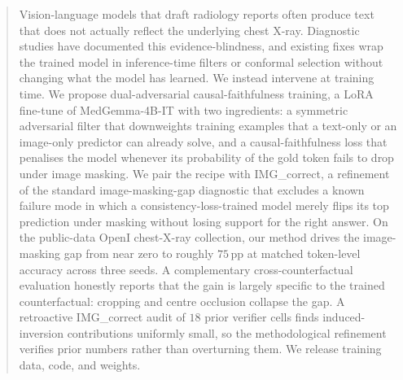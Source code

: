 \documentclass{article}
\begin{document}

\printAffiliationsAndNotice{}

\begin{abstract}
Vision-language models that draft radiology reports often produce text
that does not actually reflect the underlying chest X-ray. Diagnostic
studies have documented this evidence-blindness, and existing fixes wrap
the trained model in inference-time filters or conformal selection
without changing what the model has learned. We instead intervene at
training time. We propose dual-adversarial causal-faithfulness training,
a LoRA fine-tune of MedGemma-4B-IT with two ingredients: a symmetric
adversarial filter that downweights training examples that a text-only
or an image-only predictor can already solve, and a causal-faithfulness
loss that penalises the model whenever its probability of the gold token
fails to drop under image masking. We pair the recipe with IMG\_correct,
a refinement of the standard image-masking-gap diagnostic that excludes
a known failure mode in which a consistency-loss-trained model merely
flips its top prediction under masking without losing support for the
right answer. On the public-data OpenI chest-X-ray collection, our
method drives the image-masking gap from near zero to roughly $75$\,pp
at matched token-level accuracy across three seeds. A complementary
cross-counterfactual evaluation honestly reports that the gain is
largely specific to the trained counterfactual: cropping and centre
occlusion collapse the gap. A retroactive IMG\_correct audit of $18$
prior verifier cells finds induced-inversion contributions uniformly
small, so the methodological refinement verifies prior numbers rather
than overturning them. We release training data, code, and weights.
\end{abstract}
\end{document}
